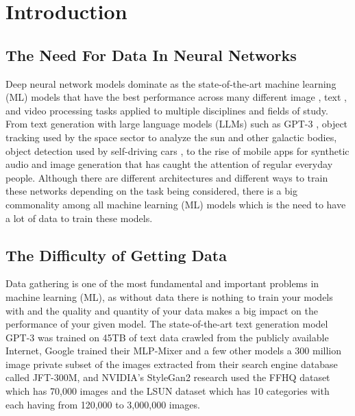 \chapter{Introduction}

\section{The Need For Data In Neural Networks}
Deep neural network models dominate as the state-of-the-art machine learning (ML) models that have the best performance across many different image \cite{StableDiffusion1} \cite{YOLOv1} \cite{EfficientNet}, text \cite{BERT}, and video processing tasks applied to multiple disciplines and fields of study. From text generation with large language models (LLMs) such as GPT-3 \cite{GPT3}, object tracking used by the space sector to analyze the sun \cite{Godwill1} and other galactic bodies, object detection used by self-driving cars \cite{SelfDriving1}, to the rise of mobile apps for synthetic audio and image generation that has caught the attention of regular everyday people. Although there are different architectures and different ways to train these networks depending on the task being considered, there is a big commonality among all machine learning (ML) models which is the need to have a lot of data to train these models.

\section{The Difficulty of Getting Data}
Data gathering is one of the most fundamental and important problems in machine learning (ML), as without data there is nothing to train your models with and the quality and quantity of your data makes a big impact on the performance of your given model. The state-of-the-art text generation model GPT-3 \cite{GPT3} was trained on 45TB of text data crawled from the publicly available Internet, Google trained their MLP-Mixer \cite{MLPMixer} and a few other models a 300 million image private subset of the images extracted from their search engine database called JFT-300M, and NVIDIA's StyleGan2 \cite{StyleGAN2} research used the FFHQ dataset which has 70,000 images and the LSUN dataset which has 10 categories with each having from 120,000 to 3,000,000 images.

